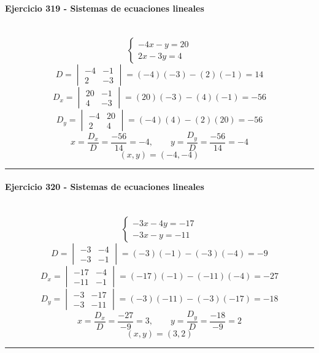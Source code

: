 \documentclass[10pt,a4paper]{article}
\newcommand{\res}[1]{\paragraph{#1}\mbox{}\\[-1.2em]}
\begin{document}
\res{Ejercicio 319 - Sistemas de ecuaciones lineales}
\[ \begin{cases}- 4 x - y=20\\2 x - 3 y=4\end{cases} \]
\[ D=\begin{vmatrix}-4&-1\\2&-3\end{vmatrix}=(-4)(-3)-(2)(-1)=14 \]
\[ D_x=\begin{vmatrix}20&-1\\4&-3\end{vmatrix}=(20)(-3)-(4)(-1)=-56 \]
\[ D_y=\begin{vmatrix}-4&20\\2&4\end{vmatrix}=(-4)(4)-(2)(20)=-56 \]
\[ x=\frac{D_x}{D}=\frac{-56}{14}=-4,\qquad y=\frac{D_y}{D}=\frac{-56}{14}=-4 \]
\[ \boxed{(x,y)=(-4,-4)} \]
\vspace{1mm}\hrule\vspace{2mm}
\res{Ejercicio 320 - Sistemas de ecuaciones lineales}
\[ \begin{cases}- 3 x - 4 y=-17\\- 3 x - y=-11\end{cases} \]
\[ D=\begin{vmatrix}-3&-4\\-3&-1\end{vmatrix}=(-3)(-1)-(-3)(-4)=-9 \]
\[ D_x=\begin{vmatrix}-17&-4\\-11&-1\end{vmatrix}=(-17)(-1)-(-11)(-4)=-27 \]
\[ D_y=\begin{vmatrix}-3&-17\\-3&-11\end{vmatrix}=(-3)(-11)-(-3)(-17)=-18 \]
\[ x=\frac{D_x}{D}=\frac{-27}{-9}=3,\qquad y=\frac{D_y}{D}=\frac{-18}{-9}=2 \]
\[ \boxed{(x,y)=(3,2)} \]
\vspace{1mm}\hrule\vspace{2mm}
\end{document}
